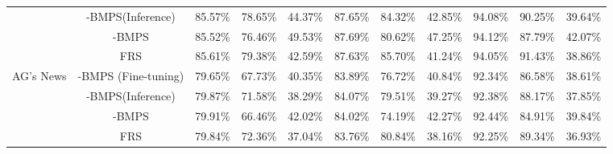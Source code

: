 \begin{table*}[]
{\begin{tabular}{ccp{1cm}p{1cm}p{1cm}p{1cm}p{1cm}p{1cm}p{1cm}p{1cm}p{1cm}}
& -BMPS(Inference)   &    85.57\%       &   78.65\%         &  44.37\%          &   87.65\%         &    84.32\%       &   42.85\%         &    94.08\%       &  90.25\%       &  39.64\%        \\
& -BMPS                   &   85.52\%         &   76.46\%         &    49.53\%        &    87.69\%       &   80.62\%        &  47.25\%     &   94.12\%        &   87.79\%   &   42.07\%    \\ \cmidrule(r){2-11}
& FRS      &    85.61\%         &  79.38\%          &  42.59\%          &   87.63\%        &  85.70\%         &  41.24\%       &   94.05\%        &  91.43\%    &  38.86\%   \\
\bottomrule \toprule
\multirow{4}{*}{AG's News}   
& -BMPS (Fine-tuning)   &    79.65\%       &   67.73\%         &  40.35\%          &   83.89\%         &    76.72\%       &   40.84\%         &    92.34\%       &    86.58\%    &  38.61\%     \\
& -BMPS(Inference)   &    79.87\%       &   71.58\%         &  38.29\%          &   84.07\%         &    79.51\%       &   39.27\%         &    92.38\%       &    88.17\%    &  37.85\%  \\ 
& -BMPS                   &   79.91\%         &   66.46\%         &    42.02\%        &    84.02\%       &   74.19\%        &  42.27\%     &   92.44\%        &   84.91\%    &   39.84\%    \\ \cmidrule(r){2-11}
& FRS      &    79.84\%         &  72.36\%          &  37.04\%          &   83.76\%        &  80.84\%         &  38.16\%       &   92.25\%        &  89.34\%    &  36.93\%   \\
\bottomrule
\end{tabular}
}
\label{tab:further ablation_study}
\end{table*}


